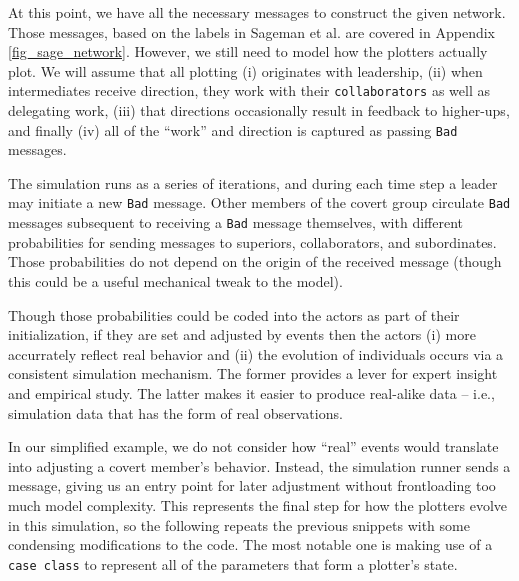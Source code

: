 \documentclass{article}
\newcommand{\Appref}[1]{Appendix \ref{fig_#1}}
\begin{document}
At this point, we have all the necessary messages to construct the given network.  Those messages, based on the labels in Sageman et al. are covered in \Appref{sage_network}.  However, we still need to model how the plotters actually plot.  We will assume that all plotting (i) originates with leadership, (ii) when intermediates receive direction, they work with their \texttt{collaborators} as well as delegating work, (iii) that directions occasionally result in feedback to higher-ups, and finally (iv) all of the ``work'' and direction is captured as passing \texttt{Bad} messages.

The simulation runs as a series of iterations, and during each time step a leader may initiate a new \texttt{Bad} message.  Other members of the covert group circulate \texttt{Bad} messages subsequent to receiving a \texttt{Bad} message themselves, with different probabilities for sending messages to superiors, collaborators, and subordinates.  Those probabilities do not depend on the origin of the received message (though this could be a useful mechanical tweak to the model).

Though those probabilities could be coded into the actors as part of their initialization, if they are set and adjusted by events then the actors (i) more accurrately reflect real behavior and (ii) the evolution of individuals occurs via a consistent simulation mechanism.  The former provides a lever for expert insight and empirical study.  The latter makes it easier to produce real-alike data -- i.e., simulation data that has the form of real observations.

In our simplified example, we do not consider how ``real'' events would translate into adjusting a covert member's behavior.  Instead, the simulation runner sends a message, giving us an entry point for later adjustment without frontloading too much model complexity.  This represents the final step for how the plotters evolve in this simulation, so the following repeats the previous snippets with some condensing modifications to the code.  The most notable one is making use of a \texttt{case class} to represent all of the parameters that form a plotter's state.
\end{document}
